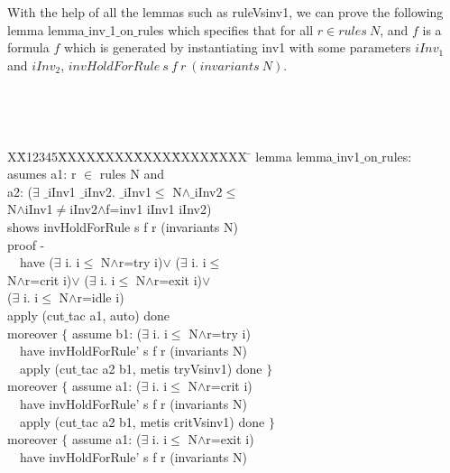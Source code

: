 \documentclass[final]{IEEEtran}
\newlength{\fminilength}
\newenvironment{fmini}[1][\linewidth]
  {\setlength{\fminilength}{#1\fboxsep-2\fboxrule}%
   \vspace{2ex}\noindent\begin{lrbox}{\fminibox}\begin{minipage}{\fminilength}%
   \mbox{ }\hfill\vspace{-2.5ex}}%
  {\end{minipage}\end{lrbox}\vspace{1ex}\hspace{0ex}%
   \framebox{\usebox{\fminibox}}}
\newenvironment{specification}
{\noindent\scriptsize
\tt\begin{fmini}\begin{tabbing}X\=X12345\=XXXX\=XXXX\=XXXX\=XXXX\=XXXX
\=\+\kill} {\end{tabbing}\normalfont\end{fmini}}
\def \twoSpaces {\ \ }
\def \iInv {iInv}
\begin{document}
{With the help of all the lemmas such as {\sf ruleVsinv1},  we can prove the following lemma  {\sf lemma$\_$inv$\_$1$\_$on$\_$rules} which
specifies that for all $r \in rules ~N$, and $f$ is a formula $f$ which is generated by instantiating inv1 with some parameters $\iInv_1$ and $iInv_2$, $invHoldForRule ~s~ f~ r~ (invariants~ N)$.

\begin{specification}
lemma lemma$\_$inv1$\_$on$\_$rules:\\
  asumes a1:
r $\in$ rules N
 and \\
 a2:
($\exists$ $\_$iInv1 $\_$iInv2. $\_$iInv1$\le$
N$\wedge$$\_$iInv2$\le$\\
N$\wedge$\iInv1$\neq$\iInv2$\wedge$f=inv1  \iInv1 \iInv2)\\

 shows
invHoldForRule s f r (invariants N)\\

  proof -\\
\twoSpaces  have
($\exists$ i. i$\le$
N$\wedge$r=try  i)$\vee$
    ($\exists$ i. i$\le$\\
N$\wedge$r=crit  i)$\vee$
    ($\exists$ i. i$\le$
N$\wedge$r=exit  i)$\vee$\\
    ($\exists$ i. i$\le$
N$\wedge$r=idle  i)\\

  apply (cut$\_$tac a1, auto) done\\
    moreover $\{$      assume b1:
($\exists$ i. i$\le$
N$\wedge$r=try  i)\\

\twoSpaces      have invHoldForRule' s f r (invariants N)\\

\twoSpaces      apply (cut$\_$tac a2 b1, metis tryVsinv1) done
    $\}$\\


    moreover $\{$ assume a1:
($\exists$ i. i$\le$
N$\wedge$r=crit  i)\\

\twoSpaces      have
invHoldForRule' s f r (invariants N)\\

\twoSpaces      apply (cut$\_$tac a2 b1, metis critVsinv1) done
    $\}$\\


    moreover $\{$
      assume a1:
($\exists$ i. i$\le$
N$\wedge$r=exit  i)\\

\twoSpaces      have
invHoldForRule' s f r (invariants N)\\


\end{specification}}
\end{document}

